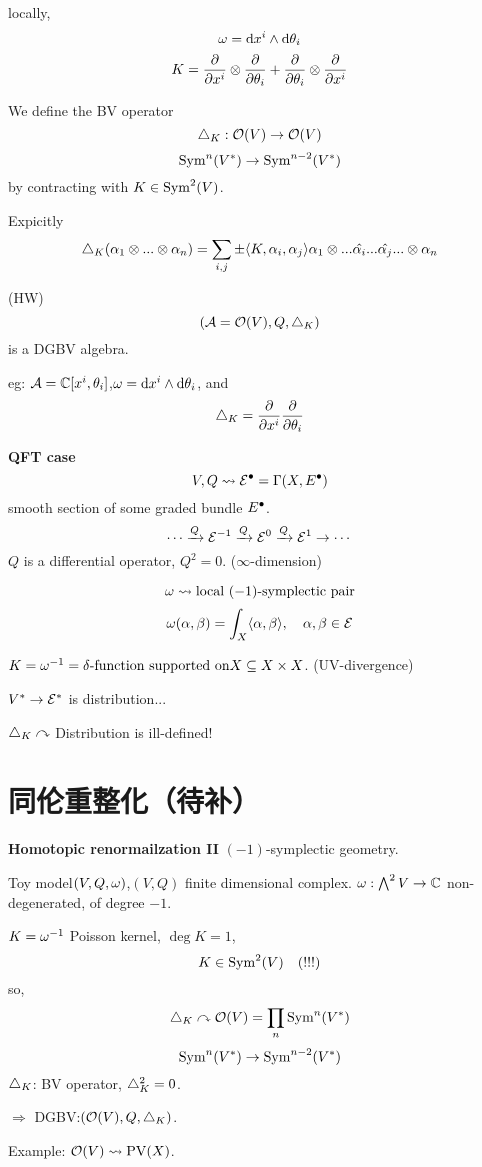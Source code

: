 locally,
$$\omega=\mathrm{d} x^i\wedge\mathrm{d}\theta_i$$
$$K=\frac{\partial } {\partial x^i}\otimes\frac{\partial } {\partial \theta_i}+\frac{\partial } {\partial \theta_i}\otimes\frac{\partial } {\partial x^i}$$

We define the BV operator
$$\triangle_K:\mathcal{O}(V)\to\mathcal{O}(V)$$
$$\operatorname{Sym}^n(V^*)\to\operatorname{Sym}^{n-2}(V^*)$$
by contracting with $K\in\operatorname{Sym}^2(V)$.

Expicitly
$$\triangle_K(\alpha_1\otimes...\otimes\alpha_n)
=\sum_{i,j}\pm\langle K,\alpha_i,\alpha_j\rangle\alpha_1\otimes...\hat{\alpha_i}...\hat{\alpha_j}...\otimes\alpha_n$$

\begin{prop}(HW)
$$(\mathcal{A}=\mathcal{O}(V),Q,\triangle_K)$$
is a DGBV algebra.
\end{prop}

eg: $\mathcal{A}=\mathbb{C}[x^i,\theta_i]$,$\omega=\mathrm{d} x^i\wedge\mathrm{d}\theta_i$, and
$$\triangle_K=\frac{\partial } {\partial x^i}\frac{\partial } {\partial \theta_i}$$

\textbf{QFT case}
$$V,Q\rightsquigarrow
\mathcal{E}^{\bullet}=\Gamma(X,E^{\bullet})$$
smooth section of some graded bundle $E^{\bullet}$.
$$\cdots\xrightarrow{Q}\mathcal{E}^{-1}\xrightarrow{Q}\mathcal{E}^0\xrightarrow{Q}\mathcal{E}^1\to\cdots$$
$Q$ is a differential operator, $Q^2=0$. ($\infty$-dimension)

$$\omega\rightsquigarrow\text{local $(-1)$-symplectic pair}$$
$$\omega(\alpha,\beta)=\int_X\langle\alpha,\beta\rangle,\quad\alpha,\beta\in\mathcal{E}$$

$K=\omega^{-1}=\delta\text{-function supported on} X\subseteq X\times X$.
(UV-divergence)

$V^*\to\mathcal{E}^*$ is distribution...

$\triangle_K\curvearrowright$ Distribution is ill-defined!


\section{同伦重整化（待补）}
\textbf{Homotopic renormailzation II}
$(-1)$-symplectic geometry.

Toy model$(V,Q,\omega)$,$(V,Q)$ finite dimensional complex.
$\omega:\bigwedge\nolimits^{2}V\to\mathbb{C}$
non-degenerated, of degree $-1$.

$K=\omega^{-1}$ Poisson kernel, $\deg K=1$,
$$K\in\operatorname{Sym}^2(V)\quad (!!!)$$
so,
$$\triangle_K\curvearrowright\mathcal{O}(V)=\prod_{n}\operatorname{Sym}^n(V^*)$$
$$\operatorname{Sym}^n(V^*)\to\operatorname{Sym}^{n-2}(V^*)$$
$\triangle_K$: BV operator, $\triangle_K^2=0$.

$\Rightarrow$ DGBV:$(\mathcal{O}(V),Q,\triangle_K)$.

Example: $\mathcal{O}(V)\rightsquigarrow\operatorname{PV}(X)$.

